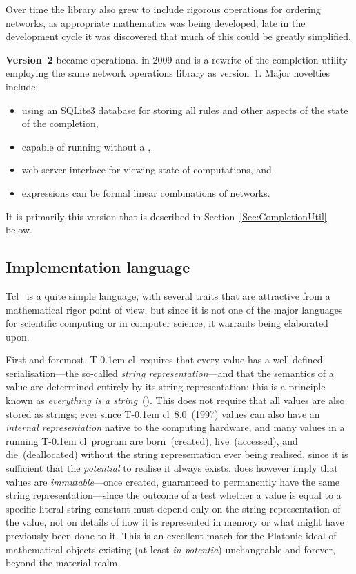 \documentclass{article}
\theoremstyle{definition}
\newcommand{\Tcl}{T\kern-0.1em cl}
\begin{document}
Over time the library also grew to include rigorous operations for 
ordering networks, as appropriate mathematics was being developed; 
late in the development cycle it was discovered that much of this 
could be greatly simplified.


\textbf{Version~2} became operational in 2009 and is a rewrite of the 
completion utility employing the same network operations library as 
version~1. Major novelties include:
\begin{itemize}
  \item
    using an SQLite3 database for storing all rules and other aspects 
    of the state of the completion,
  \item
    capable of running without a ,
  \item
    web server interface for viewing state of computations, and
  \item
    expressions can be formal linear combinations of networks.
\end{itemize}
It is primarily this version that is described in 
Section~\ref{Sec:CompletionUtil} below.


\subsection{Implementation language}

Tcl~\cite{Ousterhout} is a quite simple language, with several traits 
that are attractive from a mathematical rigor point of view, but 
since it is not one of the major languages for scientific computing or 
in computer science, it warrants being elaborated upon.

First and foremost, \Tcl\ requires that every value has a well-defined 
serialisa\-tion\hspace*{0pt}---the so-called 
\emph{string representation}---and that 
the semantics of a value are determined entirely by its string 
representation; this is a principle known as \emph{everything is a 
string}~(). This does not require that all values are 
also stored as strings; ever since \Tcl~8.0~(1997) values can also 
have an \emph{internal representation} native to the computing 
hardware, and many values in a running \Tcl\ program are born~(created), 
live~(accessed), and die~(deallocated) without the string 
representation ever being realised, since it is sufficient that the 
\emph{potential} to realise it always exists.  does 
however imply that values are \emph{immutable}---once created, 
guaranteed to permanently have the same string representation---since 
the outcome of a test whether a value is equal to a specific literal 
string constant must depend only on the string representation of the 
value, not on details of how it is represented in memory or what 
might have previously been done to it. This is an excellent match for 
the Platonic ideal of mathematical objects existing (at least 
\emph{in potentia}) unchangeable and forever, beyond the material 
realm.
\end{document}
